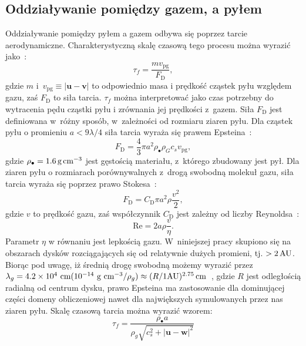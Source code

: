 \subsection{Oddziaływanie pomiędzy gazem, a pyłem}
Oddziaływanie pomiędzy pyłem a gazem odbywa się poprzez tarcie aerodynamiczne.
Charakterystyczną skalę czasową tego procesu można wyrazić jako~\cite{W73}:
%
\begin{equation}
   \tau_f = \frac{mv_\textrm{pg}}{F_\textrm{D}},
\end{equation}
%
gdzie $m$ i~$v_{\textrm{pg}}\equiv|\mathbf{u} - \mathbf{v}|$ to odpowiednio masa
i prędkość cząstek pyłu względem gazu, zaś $F_\textrm{D}$ to siła tarcia.
$\tau_f$ można interpretować jako czas potrzebny do wytracenia pędu cząstki pyłu
i zrównania jej prędkości z~gazem. Siła $F_\textrm{D}$ jest definiowana w~różny
sposób, w~zależności od rozmiaru ziaren pyłu. Dla cząstek pyłu o promieniu $a < 9
\lambda / 4$ siła tarcia wyraża się prawem Epsteina~\cite{W77}:
%
\begin{equation}
   F_\textrm{D} = \frac{4}{3}\pi a^2 \rho_\bullet \rho_G c_s v_\textrm{pg}, 
\end{equation}
%
gdzie $\rho_\bullet = 1.6\hbox{$\thinspace\textrm{g}$}\hbox{$\thinspace\textrm{cm}$}^{-3}$ jest gęstością materiału, z~którego
zbudowany jest pył. Dla ziaren pyłu o rozmiarach porównywalnych z~drogą swobodną
molekuł gazu, siła tarcia wyraża się poprzez prawo Stokesa~\cite{W77}:
\begin{equation}
  F_\textrm{D} = C_\textrm{D} \pi a^2 \rho \frac{v^2}{2},
\end{equation}
gdzie $v$ to prędkość gazu, zaś współczynnik $C_\textrm{D}$ jest zależny od
liczby Reynoldsa~\cite{W77}:
\begin{equation}
   \textrm{Re} = 2 a \rho \frac{v}{\eta}.
   \label{eq:Re}
\end{equation}
Parametr $\eta$ w równaniu  jest lepkością gazu.
W~niniejszej pracy skupiono się
na obszarach dysków rozciągających się od relatywnie dużych promieni, tj.
$>2\hbox{$\thinspace\textrm{AU}$}$.  Biorąc pod uwagę, iż średnią drogę swobodną możemy wyrazić przez
$\lambda_g = 4.2\times 10^4\textrm{ cm} (10^{-14}\textrm{ g cm}^{-3}/\rho_g)
\approx (R/1 \textrm{AU})^{2.75}\hbox{$\thinspace\textrm{cm}$}$~\citep{W77,BT09}, gdzie $R$ jest odległością
radialną od centrum dysku, prawo Epsteina ma zastosowanie dla dominującej części
domeny obliczeniowej nawet dla największych symulowanych przez nas ziaren pyłu.
Skalę czasową tarcia można wyrazić wzorem:
%
\begin{equation} 
   \tau_f = \frac{\rho_\bullet a} {\rho_g \sqrt{c_s^2 +
      |\mathbf{u} - \mathbf{w}|^2 }} \label{eq:tauf} 
\end{equation}
